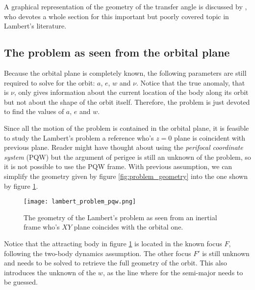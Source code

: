 A graphical representation of the geometry of the transfer angle is discussed by
\cite{der2011}, who devotes a whole section for this important but poorly
covered topic in Lambert's literature.

\subsection{The problem as seen from the orbital plane}

Because the orbital plane is completely known, the following parameters are
still required to solve for the orbit: $a$, $e$, $w$ and $\nu$. Notice that the
true anomaly, that is $\nu$, only gives information about the current location
of the body along its orbit but not about the shape of the orbit itself.
Therefore, the problem is just devoted to find the values of $a$, $e$ and $w$.

Since all the motion of the problem is contained in the orbital plane, it is
feasible to study the Lambert's problem a reference who's $z=0$ plane is
coincident with previous plane. Reader might have thought about using the
\textit{perifocal coordinate system} (PQW) but the argument of perigee is still
an unknown of the problem, so it is not possible to use the PQW frame. With
previous assumption, we can simplify the geometry given by figure
\ref{fig:problem_geometry} into the one shown by figure
\ref{fig:lambert_problem_pqw}.

\vspace{0.15cm}
\begin{figure}[H]
  \centering
  \texttt{[image: lambert\_problem\_pqw.png]}
  \caption[Lambert's problem as seen from the PQW frame]{
    The geometry of the Lambert's problem as seen from an inertial frame who's
    $XY$ plane coincides with the orbital one.
  }
  \label{fig:lambert_problem_pqw}
\end{figure}

Notice that the attracting body in figure \ref{fig:lambert_problem_pqw} is
located in the known focus $F$, following the two-body dynamics assumption. The
other focus $F'$ is still unknown and needs to be solved to retrieve the full
geometry of the orbit. This also introduces the unknown of the $w$, as the line
where for the semi-major needs to be guessed.


